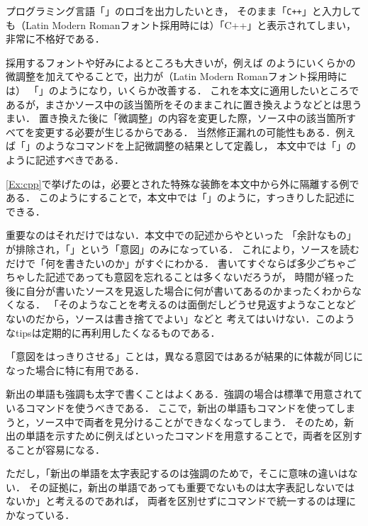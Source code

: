\begin{Ex} \label{Ex:cpp}
    プログラミング言語「{\cpp}」のロゴを出力したいとき，
    そのまま「\lstinline|C++|」と入力しても（Latin Modern Romanフォント採用時には）「{C++}」と表示されてしまい，
    非常に不格好である．
    
    採用するフォントや好みによるところも大きいが，例えば
    のようにいくらかの微調整を加えてやることで，出力が（Latin Modern Romanフォント採用時には）
    「{}」のようになり，いくらか改善する．
    これを本文に適用したいところであるが，まさかソース中の該当箇所をそのままこれに置き換えようなどとは思うまい．
    置き換えた後に「微調整」の内容を変更した際，ソース中の該当箇所すべてを変更する必要が生じるからである．
    当然修正漏れの可能性もある．例えば「」のようなコマンドを上記微調整の結果として定義し，
    本文中では「」のように記述すべきである．
\end{Ex}

\cref{Ex:cpp}で挙げたのは，必要とされた特殊な装飾を本文中から外に隔離する例である．
このようにすることで，本文中では「」のように，すっきりした記述にできる．

重要なのはそれだけではない．本文中での記述からやといった
「余計なもの」が排除され，「」という「意図」のみになっている．
これにより，ソースを読むだけで「何を書きたいのか」がすぐにわかる．
書いてすぐならば多少ごちゃごちゃした記述であっても意図を忘れることは多くないだろうが，
時間が経った後に自分が書いたソースを見返した場合に何が書いてあるのかまったくわからなくなる．
「そのようなことを考えるのは面倒だしどうせ見返すようなことなどないのだから，ソースは書き捨てでよい」などと
考えてはいけない．このようなtipsは定期的に再利用したくなるものである．

「意図をはっきりさせる」ことは，異なる意図ではあるが結果的に体裁が同じになった場合に特に有用である．

\begin{Ex} \label{Ex:intention}
    新出の単語も強調も太字で書くことはよくある．強調の場合は標準で用意されているコマンドを使うべきである．
    ここで，新出の単語もコマンドを使ってしまうと，ソース中で両者を見分けることができなくなってしまう．
    そのため，新出の単語を示すために例えばといったコマンドを用意することで，両者を区別することが容易になる．

    ただし，「新出の単語を太字表記するのは強調のためで，そこに意味の違いはない．
    その証拠に，新出の単語であっても重要でないものは太字表記しないではないか」と考えるのであれば，
    両者を区別せずにコマンドで統一するのは理にかなっている．
\end{Ex}

